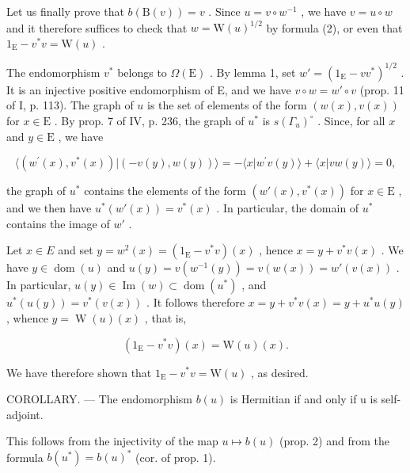 Let us finally prove that \(b(\mathrm{B}(v)) = v\) . Since \(u = v \circ w^{-1}\) , we have \(v = u \circ w\) and it therefore suffices to check that \(w = \mathrm{W}(u)^{1/2}\) by formula (2), or even that \(1_{\mathrm{E}} - v^{*}v = \mathrm{W}(u)\) .

The endomorphism \(v^*\) belongs to \(\Omega(\mathrm{E})\) . By lemma 1, set \(w' = (1_{\mathrm{E}} - vv^{*})^{1/2}\) . It is an injective positive endomorphism of E, and we have \(v \circ w = w' \circ v\) (prop. 11 of I, p. 113). The graph of \(u\) is the set of elements of the form \((w(x), v(x))\) for \(x \in \mathrm{E}\) . By prop. 7 of IV, p. 236, the graph of \(u^*\) is \(s(\Gamma_u)^{\circ}\) . Since, for all \(x\) and \(y \in \mathrm{E}\) , we have

\[
\langle (w ^ {\prime} (x), v ^ {*} (x)) | (- v (y), w (y)) \rangle = - \langle x | w ^ {\prime} v (y) \rangle + \langle x | v w (y) \rangle = 0,
\]

the graph of \(u^*\) contains the elements of the form \((w'(x), v^*(x))\) for \(x \in \mathrm{E}\) , and we then have \(u^*(w'(x)) = v^*(x)\) . In particular, the domain of \(u^*\) contains the image of \(w'\) .

Let \(x \in E\) and set \(y = w^{2}(x) = (1_{\mathrm{E}} - v^{*}v)(x)\) , hence \(x = y + v^{*}v(x)\) . We have \(y \in \operatorname{dom}(u)\) and \(u(y) = v(w^{-1}(y)) = v(w(x)) = w'(v(x))\) . In particular, \(u(y) \in \operatorname{Im}(w) \subset \operatorname{dom}(u^{*})\) , and \(u^{*}(u(y)) = v^{*}(v(x))\) . It follows therefore \(x = y + v^{*}v(x) = y + u^{*}u(y)\) , whence \(y = \operatorname{W}(u)(x)\) , that is,

\[
(1 _ {\mathrm{E}} - v ^ {*} v) (x) = \mathrm{W} (u) (x).
\]

We have therefore shown that \(1_{\mathrm{E}} - v^{*}v = \mathrm{W}(u)\) , as desired.

COROLLARY. --- The endomorphism \(b(u)\) is Hermitian if and only if u is self-adjoint.

This follows from the injectivity of the map \(u \mapsto b(u)\) (prop. 2) and from the formula \(b(u^{*}) = b(u)^{*}\) (cor. of prop. 1).

